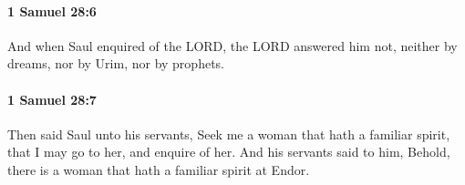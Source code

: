 		\paragraph{1 Samuel 28:6} %
			\label{1SAMUEL-28-6}

			And when Saul enquired of the LORD, the LORD answered him not, neither by dreams, nor by Urim, nor by prophets.


		\paragraph{1 Samuel 28:7} %
			\label{1SAMUEL-28-7}

			Then said Saul unto his servants, Seek me a woman that hath a familiar spirit, that I may go to her, and enquire of her. And his servants said to him, Behold, there is a woman that hath a familiar spirit at Endor.



